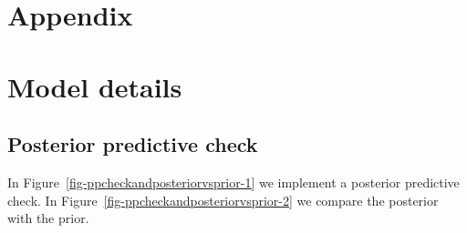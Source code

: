 \documentclass[
  letterpaper,
  DIV=11,
  numbers=noendperiod]{scrartcl}
\begin{document}
\newpage

\appendix

\hypertarget{appendix}{%
\section*{Appendix}\label{appendix}}

\hypertarget{sec-model-details}{%
\section{Model details}\label{sec-model-details}}

\hypertarget{posterior-predictive-check}{%
\subsection{Posterior predictive
check}\label{posterior-predictive-check}}

In Figure~\ref{fig-ppcheckandposteriorvsprior-1} we implement a
posterior predictive check. In
Figure~\ref{fig-ppcheckandposteriorvsprior-2} we compare the posterior
with the prior.
\end{document}
